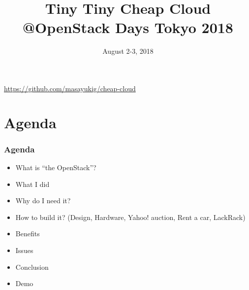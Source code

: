 \documentclass[aspectratio=169,11pt,hyperref={colorlinks=true}]{beamer}
\author[Masayuki Igawa]{%
    \texorpdfstring{%
        \begin{columns}
        \column{.45\linewidth}
            \centering
            Masayuki Igawa\\
            \href{mailto:masayuki@igawa.io}{masayuki@igawa.io}\\
            \texttt{masayukig on Freenode, GitHub, Twitter}
        \end{columns}
        }
    {Masayuki Igawa}
}
\date{August 2-3, 2018}
\title[Tiny Tiny Cheap Cloud
\hspace{2em}\insertframenumber/\inserttotalframenumber]{Tiny Tiny
  Cheap Cloud \\ @OpenStack Days Tokyo 2018}
\begin{document}
{%
\begin{frame}[noframenumbering]
    \hypersetup{colorlinks,urlcolor=white}
    \titlepage{}
    \centering
    \href{https://github.com/masayukig/cheap-cloud}{https://github.com/masayukig/cheap-cloud}
\end{frame}
}

\section{Agenda}
\begin{frame}
  \frametitle{Agenda}
  \begin{itemize}
    \item What is ``the OpenStack''?
    \item What I did
    \item Why do I need it?
    \item How to build it? (Design, Hardware, Yahoo! auction, Rent a
      car, LackRack)
    \item Benefits
    \item Issues
    \item Conclusion
    \item Demo
  \end{itemize}
\end{frame}
\end{document}
